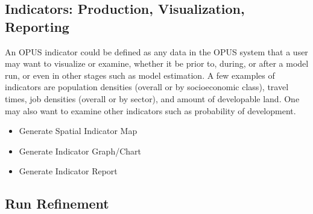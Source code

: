 \subsection{Indicators: Production, Visualization, Reporting}

An OPUS indicator could be defined as any data in the OPUS system that a user may want to visualize or examine, whether it be prior to, during, or after a model run, or even in other stages such as model estimation.  A few examples of indicators are population densities (overall or by socioeconomic class), travel times, job densities (overall or by sector), and amount of developable land.  One may also want to examine other indicators such as probability of development.

\begin{itemize}
	\item Generate Spatial Indicator Map
	\item Generate Indicator Graph/Chart
	\item Generate Indicator Report
\end{itemize}

\subsection{Run Refinement}
